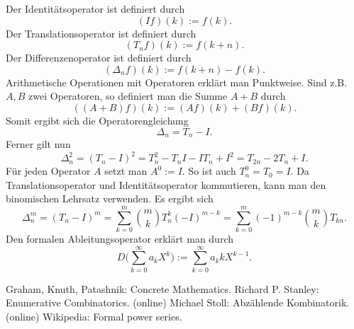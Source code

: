 \documentclass[a4paper,12pt,fleqn]{article}
\begin{document}
Der Identitätsoperator ist definiert durch
\begin{equation}
(If)(k) := f(k).
\end{equation}
Der Translationsoperator ist definiert durch
\begin{equation}
(T_n f)(k) := f(k+n).
\end{equation}
Der Differenzenoperator ist definiert durch
\begin{equation}
(\Delta_n f)(k) := f(k+n)-f(k).
\end{equation}
Arithmetische Operationen mit Operatoren erklärt man Punktweise.
Sind z.B. $A,B$ zwei Operatoren, so definiert man die Summe $A+B$
durch
\begin{equation}
((A+B)f)(k):=(A f)(k)+(B f)(k).
\end{equation}
Somit ergibt sich die Operatorengleichung
\begin{equation}
\Delta_n = T_n-I.
\end{equation}
Ferner gilt nun
\begin{equation}
\Delta_n^2 = (T_n-I)^2
= T_n^2-T_nI-IT_n+I^2
= T_{2n}-2T_n+I.
\end{equation}
Für jeden Operator $A$ setzt man $A^0:=I$. So ist auch $T_n^0=T_0=I$.
Da Translationsoperator und Identitätsoperator kommutieren, kann
man den binomischen Lehrsatz verwenden. Es ergibt sich
\[\Delta_n^m = (T_n-I)^m
= \sum_{k=0}^m \binom{m}{k} T_n^k (-I)^{m-k}
= \sum_{k=0}^m (-1)^{m-k}\binom{m}{k} T_{kn}.\]
Den formalen Ableitungsoperator erklärt man durch
\begin{equation}
D\Big(\sum_{k=0}^\infty a_kX^k\Big)
:= \sum_{k=0}^\infty a_k kX^{k-1}.
\end{equation}


\begin{thebibliography}{10}
\setlength{\itemsep}{0pt}
 Graham, Knuth, Patashnik: Concrete Mathematics.
 Richard P. Stanley: Enumerative Combinatorics. (online)
 Michael Stoll: Abzählende Kombinatorik. (online)
 Wikipedia: Formal power series.
\end{thebibliography}
\end{document}
